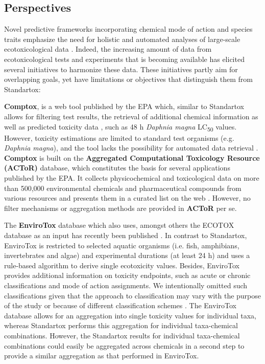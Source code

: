 \documentclass[journal,datadescriptor,submit,moreauthors,pdftex]{Definitions/mdpi}
\begin{document}
\subsection{Perspectives}
Novel predictive frameworks incorporating chemical mode of action and species traits emphasize the need for holistic and automated analyses of large-scale ecotoxicological data \citep{malaj_evolutionary_2016, vandenberg_modeling_2019}. Indeed, the increasing amount of data from ecotoxicological tests and experiments that is becoming available has elicited several initiatives to harmonize these data. These initiatives partly aim for overlapping goals, yet have limitations or objectives that distinguish them from Standartox:
\par
\textbf{Comptox}, is a web tool published by the EPA which, similar to Standartox allows for filtering test results, the retrieval of additional chemical information as well as predicted toxicity data \citep{martin_prediction_2001}, such as 48 h \textit{Daphnia magna} LC\textsubscript{50} values. However, toxicity estimations are limited to standard test organisms (e.g. \textit{Daphnia magna}), and the tool lacks the possibility for automated data retrieval \citep{williams_comptox_2017}. \textbf{Comptox} is built on the \textbf{Aggregated Computational Toxicology Resource (ACToR)} database, which constitutes the basis for several applications published by the EPA. It collects physicochemical and toxicological data on more than 500,000 environmental chemicals and pharmaceutical compounds from various resources and presents them in a curated list on the web \citep{judson_actor_2008, judson_aggregating_2012}. However, no filter mechanisms or aggregation methods are provided in \textbf{ACToR} per se.
\par
The \textbf{EnviroTox} database which also uses, amongst others the ECOTOX database as an input has recently been published \citep{healthandenvironmentalsciencesinstitutehesi_envirotox_2019, connors_creation_2019}. In contrast to Standartox, EnviroTox  is restricted to selected aquatic organisms (i.e. fish, amphibians, invertebrates and algae) and experimental durations (at least 24 h) and uses a rule-based algorithm to derive single ecotoxicity values. Besides, EnviroTox provides additional information on toxicity endpoints, such as acute or chronic classifications and mode of action assignments. We intentionally omitted such classifications given that the approach to classification may vary with the purpose of the study or because of different classification schemes \citep{kienzler_mode_2017}. The EnviroTox database allows for an aggregation into single toxicity values for individual taxa, whereas Standartox performs this aggregation for individual taxa-chemical combinations. However, the Standartox results for individual taxa-chemical combinations could easily be aggregated across chemicals in a second step to provide a similar aggregation as that performed in EnviroTox.
\end{document}
